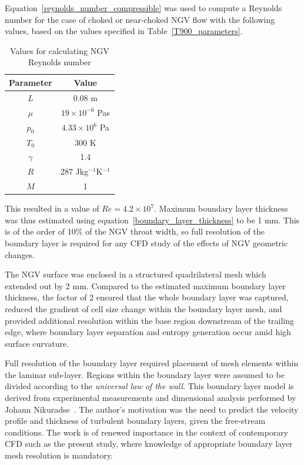\documentclass[a4paper, 11pt, oneside]{report}
\begin{document}
Equation~\ref{reynolds_number_compressible} was used to compute a Reynolds number for the case of choked or near-choked NGV flow with the following values, based on the values specified in Table~\ref{T900_parameters}.
\begin{table}[H]
\caption{Values for calculating NGV Reynolds number}
\label{reynolds_number_parameters}
\begin{center}
\begin{tabular}{|c|c|}
\hline
Parameter & Value\\
\hline
$L$ & 0.08 m\\
$\mu$ & $19 \times 10^{-6}$ Pas\\
$p_0$ & $4.33 \times 10^6$ Pa\\
$T_0$ & 300 K\\
$\gamma$ & 1.4\\
$R$ & 287 Jkg$^{-1}$K$^{-1}$\\
$M$ & 1\\
\hline
\end{tabular}
\end{center}
\end{table}
This resulted in a value of $Re = 4.2 \times 10^7$. Maximum boundary layer thickness was thus estimated using equation~\ref{boundary_layer_thickness} to be 1 mm. This is of the order of 10\% of the NGV throat width, so full resolution of the boundary layer is required for any CFD study of the effects of NGV geometric changes.

The NGV surface was enclosed in a structured quadrilateral mesh which extended out by 2 mm. Compared to the estimated maximum boundary layer thickness, the factor of 2 ensured that the whole boundary layer was captured, reduced the gradient of cell size change within the boundary layer mesh, and provided additional resolution within the base region downstream of the trailing edge, where boundary layer separation and entropy generation occur amid high surface curvature.

Full resolution of the boundary layer required placement of mesh elements within the laminar sub-layer. Regions within the boundary layer were assumed to be divided according to the \textit{universal law of the wall}. This boundary layer model is derived from experimental measurements and dimensional analysis performed by Johann Nikuradse~\cite{nikuradse_boundary_layers}. The author's motivation was the need to predict the velocity profile and thickness of turbulent boundary layers, given the free-stream conditions. The work is of renewed importance in the context of contemporary CFD such as the present study, where knowledge of appropriate boundary layer mesh resolution is mandatory. 
\end{document}
